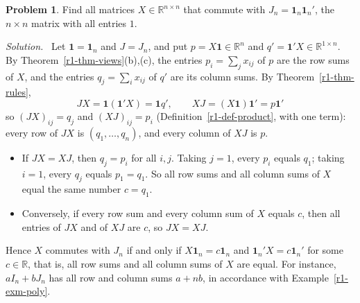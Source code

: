 \documentclass[12pt]{article}
\newcommand{\R}{\mathbb R}
\newcommand{\one}{\mathbf 1}
\theoremstyle{definition}
\newtheorem{problem}{Problem}
\newenvironment{solution}{\par\noindent\textit{Solution.}\ }{\par\smallskip}
\begin{document}
\begin{problem}\label{r1-ex-pr-commute-ones}
Find all matrices \(X\in\R^{n\times n}\) that commute with \(J_n=\one_n\one_n'\), the \(n\times n\) matrix with all
entries \(1\).
\end{problem}
\begin{solution}
Let \(\one=\one_n\) and \(J=J_n\), and put \(p=X\one\in\R^n\) and \(q'=\one'X\in\R^{1\times n}\). By
Theorem~\ref{r1-thm-views}(b),(c), the entries \(p_i=\sum_jx_{ij}\) of \(p\) are the row sums of \(X\), and the entries
\(q_j=\sum_ix_{ij}\) of \(q'\) are its column sums. By Theorem~\ref{r1-thm-rules},
\[
JX=\one(\one'X)=\one q',\qquad XJ=(X\one)\one'=p\one'
\]
so \((JX)_{ij}=q_j\) and \((XJ)_{ij}=p_i\) (Definition~\ref{r1-def-product}, with one term): every row of \(JX\) is
\((q_1,\dots,q_n)\), and every column of \(XJ\) is \(p\).
\begin{itemize}
\item If \(JX=XJ\), then \(q_j=p_i\) for all \(i,j\). Taking \(j=1\), every \(p_i\) equals \(q_1\); taking \(i=1\),
every \(q_j\) equals \(p_1=q_1\). So all row sums and all column sums of \(X\) equal the same number \(c=q_1\).
\item Conversely, if every row sum and every column sum of \(X\) equals \(c\), then all entries of \(JX\) and of \(XJ\)
are \(c\), so \(JX=XJ\).
\end{itemize}
Hence \(X\) commutes with \(J_n\) if and only if \(X\one_n=c\one_n\) and \(\one_n'X=c\one_n'\) for some \(c\in\R\), that
is, all row sums and all column sums of \(X\) are equal. For instance, \(aI_n+bJ_n\) has all row and column sums
\(a+nb\), in accordance with Example~\ref{r1-exm-poly}.
\end{solution}
\end{document}
